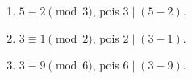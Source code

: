 \documentclass{beamer}
\begin{document}
    \begin{frame}
        \begin{exemplos}
            \begin{enumerate}[label={\arabic*})]
                \item $5\equiv 2 \pmod{3}$, pois $3 \mid (5-2)$.\pause \vspace{.3cm}
                \item $3\equiv 1 \pmod{2}$, pois $2\mid (3-1)$.\pause \vspace{.3cm}
                \item $3\equiv 9 \pmod{6}$, pois $6\mid (3-9)$.\pause \vspace{.3cm}
            \end{enumerate} 
        \end{exemplos}
    \end{frame}
\end{document}

